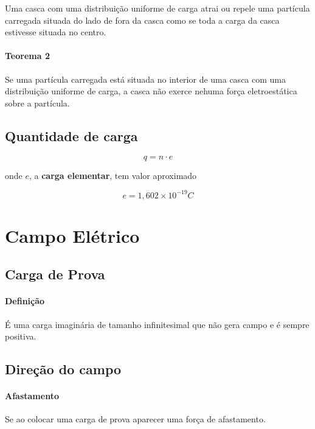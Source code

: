 Uma casca com uma distribuição uniforme de carga atrai ou repele uma
partícula carregada situada do lado de fora da casca como se toda a
carga da casca estivesse situada no centro.

\paragraph{Teorema 2}\label{teorema-2}

Se uma partícula carregada está situada no interior de uma casca com uma
distribuição uniforme de carga, a casca não exerce nehuma força
eletroestática sobre a partícula.

\subsection{Quantidade de carga}\label{quantidade-de-carga}

\[
q = n \cdot e
\]

onde $e$, a \textbf{carga elementar}, tem valor aproximado

\[
e = 1,602 \times 10^{-19} C
\]

\section{Campo Elétrico}\label{campo-eluxe9trico}

\subsection{Carga de Prova}\label{carga-de-prova}

\paragraph{Definição}\label{definiuxe7uxe3o}

É uma carga imaginária de tamanho infinitesimal que não gera campo e é
sempre positiva.

\subsection{Direção do campo}\label{direuxe7uxe3o-do-campo}

\paragraph{Afastamento}\label{afastamento}

Se ao colocar uma carga de prova aparecer uma força de afastamento.

